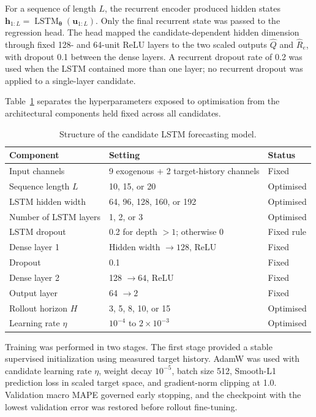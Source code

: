\documentclass[a4paper,fleqn]{cas-sc}
\begin{document}
For a sequence of length $L$, the recurrent encoder produced hidden states
$\mathbf{h}_{1:L}=\operatorname{LSTM}_{\boldsymbol{\theta}}(\mathbf{u}_{1:L})$.
Only the final recurrent state was passed to the regression head. The head mapped the candidate-dependent hidden dimension through fixed 128- and 64-unit ReLU layers to the two scaled outputs $\hat{Q}$ and $\hat{R}_{e}$, with dropout 0.1 between the dense layers. A recurrent dropout rate of 0.2 was used when the LSTM contained more than one layer; no recurrent dropout was applied to a single-layer candidate.

Table~\ref{tab:lstm_architecture} separates the hyperparameters exposed to optimisation from the architectural components held fixed across all candidates.

\begin{table}[htbp]
\centering
\caption{Structure of the candidate LSTM forecasting model.}
\label{tab:lstm_architecture}
\begin{tabular}{lll}
\toprule
\textbf{Component} & \textbf{Setting} & \textbf{Status} \\
\midrule
Input channels & 9 exogenous + 2 target-history channels & Fixed \\
Sequence length $L$ & 10, 15, or 20 & Optimised \\
LSTM hidden width & 64, 96, 128, 160, or 192 & Optimised \\
Number of LSTM layers & 1, 2, or 3 & Optimised \\
LSTM dropout & 0.2 for depth $>1$; otherwise 0 & Fixed rule \\
Dense layer 1 & Hidden width $\rightarrow 128$, ReLU & Fixed \\
Dropout & 0.1 & Fixed \\
Dense layer 2 & 128 $\rightarrow 64$, ReLU & Fixed \\
Output layer & 64 $\rightarrow 2$ & Fixed \\
Rollout horizon $H$ & 3, 5, 8, 10, or 15 & Optimised \\
Learning rate $\eta$ & $10^{-4}$ to $2\times10^{-3}$ & Optimised \\
\bottomrule
\end{tabular}
\end{table}

Training was performed in two stages. The first stage provided a stable supervised initialization using measured target history. AdamW \cite{loshchilov2019adamw} was used with candidate learning rate $\eta$, weight decay $10^{-5}$, batch size 512, Smooth-L1 prediction loss in scaled target space, and gradient-norm clipping at 1.0. Validation macro MAPE governed early stopping, and the checkpoint with the lowest validation error was restored before rollout fine-tuning.
\end{document}

